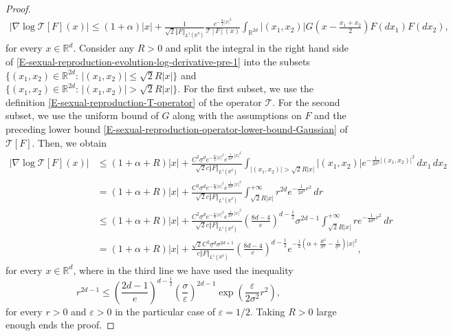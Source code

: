 \documentclass[reqno]{amsart}
\numberwithin{equation}{section}
\begin{document}
{\begin{proof}
\begin{align}\label{E-sexual-reproduction-evolution-log-derivative-pre-1}
\vert \nabla \log \mathcal{T}[F](x)\vert\leq (1+\alpha)\vert x\vert +\frac{1}{\sqrt{2}\Vert F\Vert_{L^1(\mathbb{R}^d)}}\frac{e^{-\frac{\alpha}{2}\vert x\vert^2}}{\mathcal{T}[F](x)}\int_{\mathbb{R}^{2d}}\vert (x_1,x_2)\vert G\left(x-\frac{x_1+x_2}{2}\right) F(dx_1)F(dx_2),
\end{align}
for every $x\in \mathbb{R}^d$. Consider any $R>0$ and split the integral in the right hand side of \eqref{E-sexual-reproduction-evolution-log-derivative-pre-1} into the subsets $\{(x_1,x_2)\in \mathbb{R}^{2d}:\,\vert (x_1,x_2)\vert\leq \sqrt{2}R\vert x\vert\}$ and $\{(x_1,x_2)\in \mathbb{R}^{2d}:\,\vert (x_1,x_2)\vert> \sqrt{2}R\vert x\vert\}$. For the first subset, we use the definition \eqref{E-sexual-reproduction-T-operator} of the operator $\mathcal{T}$. For the second subset, we use the uniform bound of $G$ along with the assumptions on $F$ and the preceding lower bound \eqref{E-sexual-reproduction-operator-lower-bound-Gaussian} of $\mathcal{T}[F]$. Then, we obtain
\begin{align*}
\vert \nabla \log \mathcal{T}[F](x)\vert&\leq (1+\alpha+R)\vert x\vert+\frac{C^2\underline{\sigma}^d e^{-\frac{\alpha}{2}\vert x\vert^2}e^{\frac{1}{2\underline{\sigma}^2}\vert x\vert^2}}{\sqrt{2}c\Vert F\Vert_{L^1(\mathbb{R}^d)}} \int_{\vert (x_1,x_2)\vert >\sqrt{2}R\vert x\vert} \vert (x_1,x_2)\vert e^{-\frac{1}{2\sigma^2}\vert (x_1,x_2)\vert^2}\,dx_1\,dx_2\\
&=(1+\alpha+R)\vert x\vert +\frac{C^2\underline{\sigma}^d e^{-\frac{\alpha}{2}\vert x\vert^2}e^{\frac{1}{2\underline{\sigma}^2}\vert x\vert^2}}{\sqrt{2}c\Vert F\Vert_{L^1(\mathbb{R}^d)}} \int_{\sqrt{2}R\vert x\vert}^{+\infty}r^{2d} e^{-\frac{1}{2\sigma^2}r^2}\,dr\\
&\leq  (1+\alpha+R) \vert x\vert +\frac{C^2\underline{\sigma}^d e^{-\frac{\alpha}{2}\vert x\vert^2}e^{\frac{1}{2\underline{\sigma}^2}\vert x\vert^2}}{\sqrt{2}c\Vert F\Vert_{L^1(\mathbb{R}^d)}} \left(\frac{8d-4}{e}\right)^{d-\frac{1}{2}}\sigma^{2d-1}\int_{\sqrt{2}R\vert x\vert}^{+\infty}re^{-\frac{1}{4\sigma^2}r^2}\,dr\\
&= (1+\alpha+R)\vert x\vert +\frac{\sqrt{2}C^2\underline{\sigma}^d \sigma^{2d+1}}{c\Vert F\Vert_{L^1(\mathbb{R}^d)}}\left(\frac{8d-4}{e}\right)^{d-\frac{1}{2}} e^{-\frac{1}{2}\left(\alpha+\frac{R^2}{\sigma^2}-\frac{1}{\underline{\sigma}^2}\right)\vert x\vert^2},
\end{align*}
for every $x\in \mathbb{R}^d$, where in the third line we have used the inequality
$$r^{2d-1}\leq \left(\frac{2d-1}{e}\right)^{d-\frac{1}{2}}\left(\frac{\sigma}{\varepsilon}\right)^{2d-1} \exp\left(\frac{\varepsilon}{2\sigma^2}r^2\right),$$
for every $r>0$ and $\varepsilon>0$ in the particular case of $\varepsilon=1/2$. Taking $R>0$ large enough ends the proof.
\end{proof}

}
\end{document}
